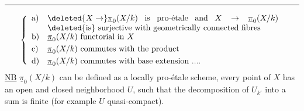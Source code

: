 \par\noindent\rule{.20\linewidth}{.4pt}\par
\[
\left\{\begin{array}{ll}
\text{a)} & \parbox[t]{.82\linewidth}{$\deleted{X\to}\underline{\pi}_0(X/k)$ is pro-étale and $X\to\underline{\pi}_0(X/k)$ \deleted{is} surjective with geometrically connected fibres}\\[.7ex]
\text{b)} & \underline{\pi}_0(X/k)\ \text{functorial in }X\\[.7ex]
\text{c)} & \underline{\pi}_0(X/k)\ \text{commutes with the product}\\[.7ex]
\text{d)} & \underline{\pi}_0(X/k)\ \text{commutes with base extension ....}
\end{array}\right.
\]
\uline{NB} $\underline{\pi}_0(X/k)$ can be defined as a locally pro-étale scheme,  every point of  $X$ has an open and closed neighborhood $U$, such that  the decomposition of $U_{k'}$ into a sum   is finite (for example $U$ quasi-compact).

